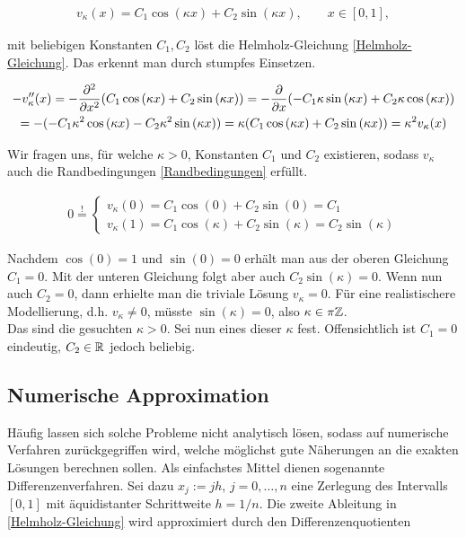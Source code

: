 \begin{align}
  v_\kappa(x) = C_1 \cos{(\kappa x)} + C_2 \sin{(\kappa x)}, \qquad
  x \in [0, 1],
  \label{Analytische_Lösung}
\end{align}

mit beliebigen Konstanten $C_1, C_2$ löst die Helmholz-Gleichung \eqref{Helmholz-Gleichung}. Das erkennt man durch stumpfes Einsetzen.

\begin{multline*}
  - v_\kappa^{\prime \prime}(x)
  = - \frac{\partial^2}{\partial x^2}
    (C_1 \cos{(\kappa x)} + C_2 \sin{(\kappa x)})
  = - \frac{\partial}{\partial x}
    (- C_1 \kappa \sin{(\kappa x)} + C_2 \kappa \cos{(\kappa x)}) \\
  = - (- C_1 \kappa^2 \cos{(\kappa x)} - C_2 \kappa^2 \sin{(\kappa x)})
  = \kappa (C_1 \cos{(\kappa x)} + C_2 \sin{(\kappa x)})
  = \kappa^2 v_\kappa(x)
\end{multline*}

Wir fragen uns, für welche $\kappa > 0$, Konstanten $C_1$ und $C_2$ existieren, sodass $v_\kappa$ auch die Randbedingungen \eqref{Randbedingungen} erfüllt.

\begin{align*}
  0 \stackrel{!}{=}
  \begin{cases}
    v_\kappa(0)
    = C_1 \cos{(0)} + C_2 \sin{(0)}
    = C_1 \\
    v_\kappa(1)
    = C_1 \cos{(\kappa)} + C_2 \sin{(\kappa)}
    = C_2 \sin{(\kappa)}
  \end{cases}
\end{align*}

Nachdem $\cos{(0)} = 1$ und $\sin{(0)} = 0$ erhält man aus der oberen Gleichung $C_1 = 0$. Mit der unteren Gleichung folgt aber auch $C_2 \sin{(\kappa)} = 0$. Wenn nun auch $C_2 = 0$, dann erhielte man die triviale Lösung $v_\kappa = 0$. Für eine realistischere Modellierung, d.h. $v_\kappa \neq 0$, müsste $\sin{(\kappa)} = 0$, also $\kappa \in \pi \mathbb{Z}$. \\

Das sind die gesuchten $\kappa > 0$. Sei nun eines dieser $\kappa$ fest. Offensichtlich ist $C_1 = 0$ eindeutig, $C_2 \in \mathbb{R}$ jedoch beliebig.

\subsection{Numerische Approximation}

Häufig lassen sich solche Probleme nicht analytisch lösen, sodass auf numerische Verfahren zurückgegriffen wird, welche möglichst gute Näherungen an die exakten Lösungen berechnen sollen. Als einfachstes Mittel dienen sogenannte Differenzenverfahren. Sei dazu $x_j := jh$, $j = 0, \ldots, n$ eine Zerlegung des Intervalls $[0, 1]$ mit äquidistanter Schrittweite $h = 1/n$. Die zweite Ableitung in \eqref{Helmholz-Gleichung} wird approximiert durch den Differenzenquotienten

